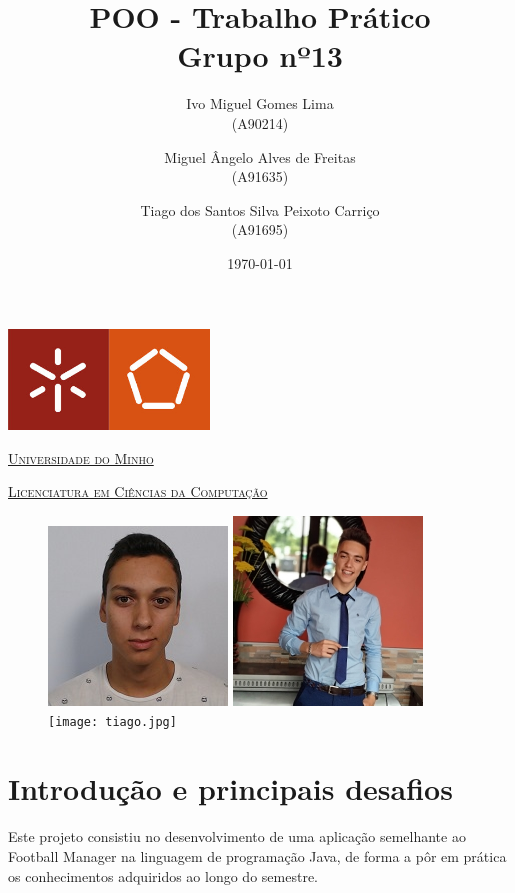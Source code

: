 \documentclass[a4paper]{report}
\title{POO - Trabalho Prático\\
	\large Grupo nº13}
\author{Ivo Miguel Gomes Lima \\ (A90214) \and Miguel Ângelo Alves de Freitas \\ (A91635)
         \and Tiago dos Santos Silva Peixoto Carriço \\ (A91695)
       } %
\date{\today} %
\begin{document}
	\begin{minipage}{0.9\linewidth}
        \centering
		\includegraphics[width=0.4\textwidth]{um.jpg}\par\vspace{1cm}
		\href{https://www.uminho.pt/PT}
		{\scshape\LARGE Universidade do Minho} \par
		\vspace{0.6cm}
		\href{https://lcc.di.uminho.pt}
		{\scshape\Large Licenciatura em Ciências da Computação} \par
		\maketitle
		\begin{figure}[H]
			\includegraphics[width=0.32\linewidth]{ivo.jpg}
			\includegraphics[width=0.32\linewidth]{miguel.jpg}
			\texttt{[image: tiago.jpg]}
		\end{figure}
	\end{minipage}
	
	\tableofcontents
	
	\pagebreak
	
	\chapter{Introdução e principais desafios}
%	
	Este projeto consistiu no desenvolvimento de uma aplicação semelhante ao Football Manager na linguagem de programação Java, de forma a pôr em prática os conhecimentos adquiridos ao longo do semestre. 
	
\end{document}

